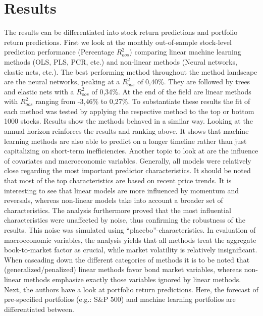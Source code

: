 \section{Results}

The results can be differentiated into stock return predictions and portfolio return predictions.
\newline
First we look at the monthly out-of-sample stock-level prediction performance (Percentage $R^{2}_{oos}$) comparing linear machine learning methods (OLS, PLS, PCR, etc.) and non-linear methods (Neural networks, elastic nets, etc.). The best performing method throughout the method landscape are the neural networks, peaking at a $R^{2}_{oos}$ of 0,40\%. They are followed by trees and elastic nets with a $R^{2}_{oos}$ of 0,34\%. At the end of the field are linear methods with $R^{2}_{oos}$ ranging from -3,46\% to 0,27\%. To substantiate these results the fit of each method was tested by applying the respective method to the top or bottom 1000 stocks. Results show the methods behaved in a similar way.
\newline
Looking at the annual horizon reinforces the results and ranking above. It shows that machine learning methods are also able to predict on a longer timeline rather than just capitalizing on short-term inefficiencies.
\newline
Another topic to look at are the influence of covariates and macroeconomic variables.
Generally, all models were relatively close regarding the most important predictor characteristics. It should be noted that most of the top characteristics are based on recent price trends. It is interesting to see that linear models are more influenced by momentum and reversals, whereas non-linear models take into account a broader set of characteristics. The analysis furthermore proved that the most influential characteristics were unaffected by noise, thus confirming the robustness of the results. This noise was simulated using “placebo”-characteristics.
In evaluation of macroeconomic variables, the analysis yields that all methods treat the aggregate book-to-market factor as crucial, while market volatility is relatively insignificant. When cascading down the different categories of methods it is to be noted that (generalized/penalized) linear methods favor bond market variables, whereas non-linear methods emphasize exactly those variables ignored by linear methods.
\newline
Next, the authors have a look at portfolio return predictions. Here, the forecast of pre-specified portfolios (e.g.: S\&P 500) and machine learning portfolios are differentiated between.
